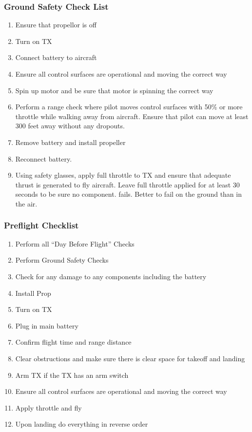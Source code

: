 \subsubsection{Ground Safety Check List}
\begin{enumerate}[itemsep=-5pt]
  \item Ensure that propellor is off
  \item Turn on TX
  \item Connect battery to aircraft
  \item Ensure all control surfaces are operational and moving the
    correct way
  \item Spin up motor and be sure that motor is spinning the correct
    way
  \item Perform a range check where pilot moves control surfaces with
    50\% or more throttle while walking away from aircraft. Ensure that pilot can move at least
    300 feet away without any dropouts.
  \item Remove battery and install propeller
  \item Reconnect battery.
  \item Using safety glasses, apply full throttle to TX and ensure
    that adequate thrust is generated to fly aircraft. Leave full
    throttle applied for at least 30 seconds to be sure no component. 
    fails. Better to fail on the ground than in the air.
\end{enumerate}

\subsubsection{Preflight Checklist}

\begin{enumerate}[itemsep=-5pt]
\item Perform all “Day Before Flight” Checks
\item Perform Ground Safety Checks
\item Check for any damage to any components including the battery
\item Install Prop
\item Turn on TX
\item Plug in main battery
\item Confirm flight time and range distance
\item Clear obstructions and make sure there is clear space for takeoff and landing
\item Arm TX if the TX has an arm switch
\item Ensure all control surfaces are operational and moving the correct way
\item Apply throttle and fly
\item Upon landing do everything in reverse order
\end{enumerate}


